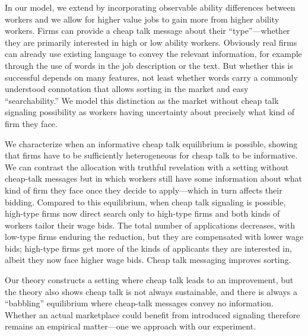 \documentclass[12pt]{article}
\begin{document}
In our model, we extend \cite{kimKircher2015} by incorporating observable ability differences between workers and we allow for higher value jobs to gain more from higher ability workers.
Firms can provide a cheap talk message about their ``type''---whether they are primarily interested in high or low ability workers.
Obviously real firms can already use existing language to convey the relevant information, for example through the use of words in the job description or the text.
But whether this is successful depends on many features, not least whether words carry a commonly understood connotation that allows sorting in the market and easy ``searchability.''
We model this distinction as the market without cheap talk signaling possibility as workers having uncertainty about precisely what kind of firm they face.

We characterize when an informative cheap talk equilibrium is possible, showing that firms have to be sufficiently heterogeneous for cheap talk to be informative.
We can contrast the allocation with truthful revelation with a setting without cheap-talk messages but in which workers still have some information about what kind of firm they face once they decide to apply---which in turn affects their bidding.
Compared to this equilibrium, when cheap talk signaling is possible, high-type firms now direct search only to high-type firms and both kinds of workers tailor their wage bids.
The total number of applications decreases, with low-type firms enduring the reduction, but they are compensated with lower wage bids; high-type firms get more of the kinds of applicants they are interested in, albeit they now face higher wage bids.
Cheap talk messaging improves sorting.

Our theory constructs a setting where cheap talk leads to an improvement, but the theory also shows cheap talk is not always sustainable, and there is always a ``babbling'' equilibrium where cheap-talk messages convey no information.
Whether an actual marketplace could benefit from introduced signaling therefore remains an empirical matter---one we approach with our experiment. 


\end{document}
